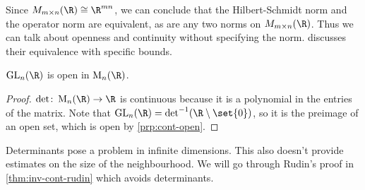 Since $M_{m \times n}(\R) \cong \R^{mn}$, we can conclude that
the Hilbert-Schmidt norm and the operator norm are equivalent,
as are any two norms on $M_{m \times n}(\R)$.
Thus we can talk about openness and continuity without specifying
the norm.
 discusses
their equivalence with specific bounds.

\begin{proposition*}
    $\GL_n(\R)$ is open in $\M_n(\R)$.
\end{proposition*}
\begin{proof}
    $\det \colon \M_n(\R) \to \R$ is continuous because
    it is a polynomial in the entries of the matrix.
    Note that $\GL_n(\R) = \det^{-1}(\R \setminus \set{0})$,
    so it is the preimage of an open set, which is open
    by \cref{prp:cont-open}.
\end{proof}
Determinants pose a problem in infinite dimensions.
This also doesn't provide estimates on the size of the neighbourhood.
We will go through Rudin's proof in \cref{thm:inv-cont-rudin}
which avoids determinants.

